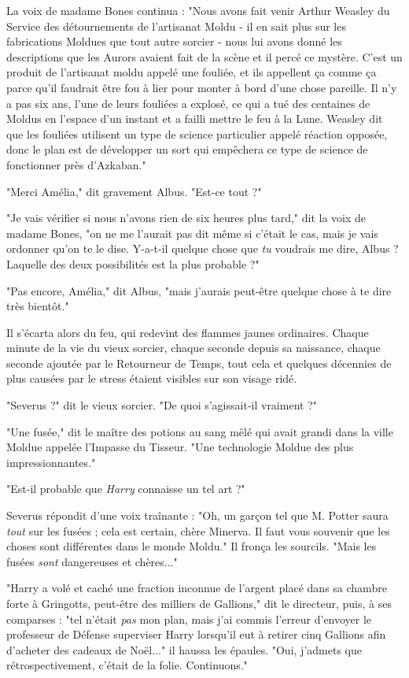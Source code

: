 La voix de madame Bones continua : "Nous avons fait venir Arthur Weasley du Service des détournements de l'artisanat Moldu - il en sait plus sur les fabrications Moldues que tout autre sorcier - nous lui avons donné les descriptions que les Aurors avaient fait de la scène et il percé ce mystère. C'est un produit de l'artisanat moldu appelé une fouliée, et ils appellent ça comme ça parce qu'il faudrait être fou à lier pour monter à bord d'une chose pareille. Il n'y a pas six ans, l'une de leurs fouliées a explosé, ce qui a tué des centaines de Moldus en l'espace d'un instant et a failli mettre le feu à la Lune. Weasley dit que les fouliées utilisent un type de science particulier appelé réaction opposée, donc le plan est de développer un sort qui empêchera ce type de science de fonctionner près d'Azkaban."

"Merci Amélia," dit gravement Albus. "Est-ce tout ?"

"Je vais vérifier si nous n'avons rien de six heures plus tard," dit la voix de madame Bones, "on ne me l'aurait pas dit même si c'était le cas, mais je vais ordonner qu'on te le dise. Y-a-t-il quelque chose que \emph{tu}  voudrais me dire, Albus ? Laquelle des deux possibilités est la plus probable ?"

"Pas encore, Amélia," dit Albus, "mais j'aurais peut-être quelque chose à te dire très bientôt."

Il s'écarta alors du feu, qui redevint des flammes jaunes ordinaires. Chaque minute de la vie du vieux sorcier, chaque seconde depuis sa naissance, chaque seconde ajoutée par le Retourneur de Temps, tout cela et quelques décennies de plus causées par le stress étaient visibles sur son visage ridé.

"Severus ?" dit le vieux sorcier. "De quoi s'agissait-il vraiment ?"

"Une fusée," dit le maître des potions au sang mêlé qui avait grandi dans la ville Moldue appelée l'Impasse du Tisseur. "Une technologie Moldue des plus impressionnantes."

"Est-il probable que \emph{Harry}  connaisse un tel art ?"

Severus répondit d'une voix traînante : "Oh, un garçon tel que M. Potter saura \emph{tout}  sur les fusées ; cela est certain, chère Minerva. Il faut vous souvenir que les choses sont différentes dans le monde Moldu." Il fronça les sourcils. "Mais les fusées \emph{sont}  dangereuses et chères..."

"Harry a volé et caché une fraction inconnue de l'argent placé dans sa chambre forte à Gringotts, peut-être des milliers de Gallions," dit le directeur, puis, à ses comparses : "tel n'était \emph{pas}  mon plan, mais j'ai commis l'erreur d'envoyer le professeur de Défense superviser Harry lorsqu'il eut à retirer cinq Gallions afin d'acheter des cadeaux de Noël..." il haussa les épaules. "Oui, j'admets que rétrospectivement, c'était de la folie. Continuons."

